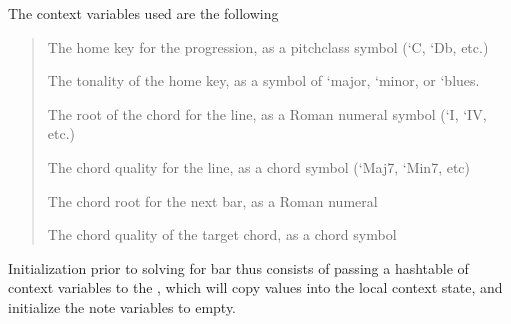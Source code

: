 \documentclass[letterpaper,10pt,english]{sphinxmanual}
\begin{document}
\sphinxAtStartPar
The context variables used are the following
\begin{quote}
\begin{description}
\sphinxAtStartPar
The home key for the progression, as a pitch\sphinxhyphen{}class symbol (‘C, ‘Db, etc.)

\sphinxAtStartPar
The tonality of the home key, as a symbol of ‘major, ‘minor, or ‘blues.

\sphinxAtStartPar
The root of the chord for the line, as a Roman numeral symbol (‘I, ‘IV, etc.)

\sphinxAtStartPar
The chord quality for the line, as a chord symbol (‘Maj7, ‘Min7, etc)

\sphinxAtStartPar
The chord root for the next bar, as a Roman numeral

\sphinxAtStartPar
The chord quality of the target chord, as a chord symbol

\end{description}
\end{quote}

\sphinxAtStartPar
Initialization prior to solving for bar thus consists of passing a hash\sphinxhyphen{}table
of context variables to the , which will copy values into the local
context state, and initialize the note variables to empty.
\end{document}
